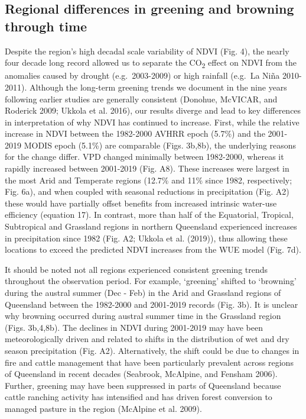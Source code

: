 \documentclass[
]{article}
\begin{document}
\hypertarget{regional-differences-in-greening-and-browning-through-time}{%
\subsection{Regional differences in greening and browning through
time}\label{regional-differences-in-greening-and-browning-through-time}}

Despite the region's high decadal scale variability of NDVI (Fig. 4),
the nearly four decade long record allowed us to separate the
CO\textsubscript{2} effect on NDVI from the anomalies caused by drought
(e.g.~2003-2009) or high rainfall (e.g.~La Niña 2010-2011). Although the
long-term greening trends we document in the nine years following
earlier studies are generally consistent (Donohue, McVICAR, and Roderick
2009; Ukkola et al. 2016), our results diverge and lead to key
differences in interpretation of why NDVI has continued to increase.
First, while the relative increase in NDVI between the 1982-2000 AVHRR
epoch (5.7\%) and the 2001-2019 MODIS epoch (5.1\%) are comparable
(Figs. 3b,8b), the underlying reasons for the change differ. VPD changed
minimally between 1982-2000, whereas it rapidly increased between
2001-2019 (Fig. A8). These increases were largest in the most Arid and
Temperate regions (12.7\% and 11\% since 1982, respectively; Fig. 6a),
and when coupled with seasonal reductions in precipitation (Fig. A2)
these would have partially offset benefits from increased intrinsic
water-use efficiency (equation 17). In contrast, more than half of the
Equatorial, Tropical, Subtropical and Grassland regions in northern
Queensland experienced increases in precipitation since 1982 (Fig. A2;
Ukkola et al. (2019)), thus allowing these locations to exceed the
predicted NDVI increases from the WUE model (Fig. 7d).

It should be noted not all regions experienced consistent greening
trends throughout the observation period. For example, `greening'
shifted to `browning' during the austral summer (Dec - Feb) in the Arid
and Grassland regions of Queensland between the 1982-2000 and 2001-2019
records (Fig. 3b). It is unclear why browning occurred during austral
summer time in the Grassland region (Figs. 3b,4,8b). The declines in
NDVI during 2001-2019 may have been meteorologically driven and related
to shifts in the distribution of wet and dry season precipitation (Fig.
A2). Alternatively, the shift could be due to changes in fire and cattle
management that have been particularly prevalent across regions of
Queensland in recent decades (Seabrook, McAlpine, and Fensham 2006).
Further, greening may have been suppressed in parts of Queensland
because cattle ranching activity has intensified and has driven forest
conversion to managed pasture in the region (McAlpine et al. 2009).
\end{document}

